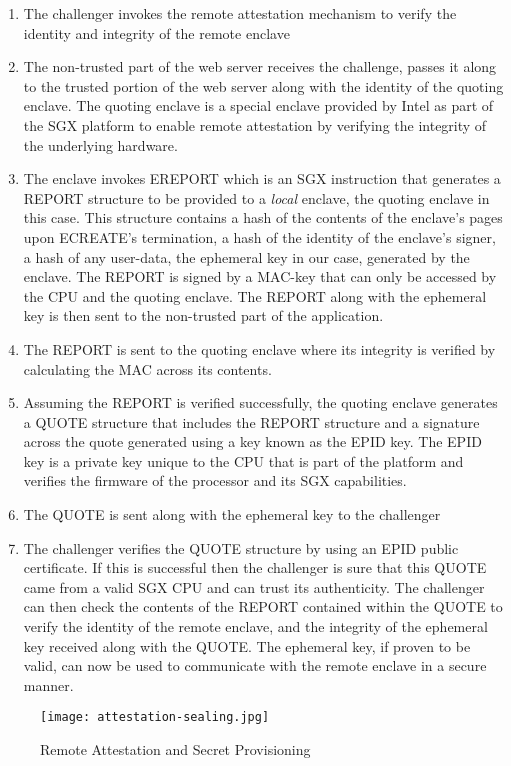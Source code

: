 \documentclass[../main.tex]{subfiles}
\begin{document}
\begin{enumerate}
	\item The challenger invokes the remote attestation mechanism to verify the identity and integrity of the remote enclave
	\item The non-trusted part of the web server receives the challenge, passes it along to the trusted portion of the web server
	      along with the identity of the quoting enclave. The quoting enclave is a special enclave provided by Intel as part of the SGX
	      platform to enable remote attestation by verifying the integrity of the underlying hardware. %
	\item The enclave invokes EREPORT which is an SGX instruction that generates a REPORT structure to be provided to a \textit{local} enclave, the quoting enclave in this case.
	      This structure contains a hash of the contents of the enclave's pages upon ECREATE's termination, a hash of the identity of the enclave's signer, a hash of any user-data, the ephemeral key in our case,
	      generated by the enclave. The REPORT is signed by a MAC-key that can only be accessed by the CPU and the quoting enclave. The REPORT along with the ephemeral key is then sent to the non-trusted part of the application.
	\item The REPORT is sent to the quoting enclave where its integrity is verified by calculating the MAC across its contents. 
	\item Assuming the REPORT is verified successfully, the quoting enclave generates a QUOTE structure that includes the REPORT structure and a signature across
	      the quote generated using a key known as the EPID key. %
	      The EPID key is a private key unique to the CPU that is part of the platform and verifies the firmware of the processor and its SGX capabilities. 
	\item The QUOTE is sent along with the ephemeral key to the challenger
	\item The challenger verifies the QUOTE structure by using an EPID public certificate. If this is successful then the challenger is sure that this QUOTE came from a valid SGX CPU and can trust
	      its authenticity. The challenger can then check the contents of the REPORT contained within the QUOTE to verify the identity of the remote enclave, and the integrity of the ephemeral key 
	      received along with the QUOTE. The ephemeral key, if proven to be valid, can now be used to communicate with the remote enclave in a secure manner.  
\end{enumerate}
		
\begin{figure}[H]
	\centering
	\texttt{[image: attestation-sealing.jpg]}
	\caption{Remote Attestation and Secret Provisioning}
	\label{fig:attest}
\end{figure}
\end{document}
